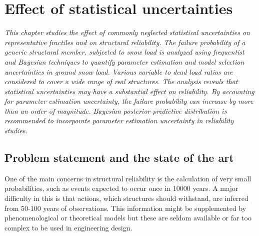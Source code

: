 \chapter{Effect of statistical uncertainties}
\label{cha:stat_unc}

\ifpdf
    \graphicspath{{Chapter3/Figs/Raster/}{Chapter3/Figs/PDF/}{Chapter3/Figs/}}
\else
    \graphicspath{{Chapter3/Figs/Vector/}{Chapter3/Figs/}}
\fi

\leftskip=1cm
\noindent
\emph{This chapter studies the effect of commonly neglected statistical uncertainties on representative fractiles and on structural reliability. The failure probability of a generic structural member, subjected to snow load is analyzed using frequentist and Bayesian techniques to quantify parameter estimation and model selection uncertainties in ground snow load. Various variable to dead load ratios are considered to cover a wide range of real structures. The analysis reveals that statistical uncertainties may have a substantial effect on  reliability. By accounting for  parameter estimation uncertainty,  the failure probability can increase by  more than  an  order  of  magnitude. Bayesian posterior predictive distribution is recommended to incorporate parameter estimation uncertainty in reliability studies.}

\leftskip=0pt\rightskip=0pt

\section{Problem statement and the state of the art}

One of the main concerns in structural reliability is the calculation of very small probabilities, such as events expected to occur once in 10000 years. A major difficulty in this is that actions, which structures should withstand, are inferred from 50-100 years of observations. This information might be supplemented by phenomenological or theoretical models but these are seldom available or far too complex to be used in engineering design. 

